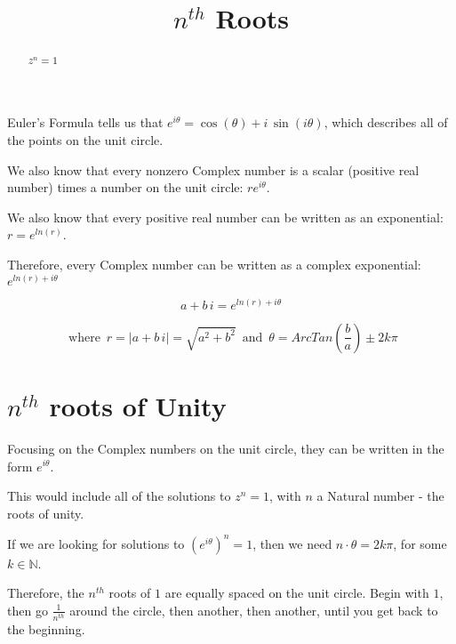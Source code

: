 \documentclass{ximera}
\title{$n^{th}$ Roots}
\begin{document}
\begin{abstract}
$z^n = 1$
\end{abstract}
\maketitle






Euler's Formula tells us that $e^{i \theta} = \cos(\theta) + i \, \sin(i \theta)$, which describes all of the points on the unit circle.

We also know that every nonzero Complex number is a scalar (positive real number) times a number on the unit circle:  $r e^{i \theta}$.

We also know that every positive real number can be written as an exponential: $r = e^{ln(r)}$.

Therefore, every Complex number can be written as a complex exponential: $ e^{ln(r) + i \theta}$


\[   a + b \, i =    e^{ln(r) + i \theta}   \]

\[   \text{ where } \,   r = |a + b \, i| = \sqrt{a^2 + b^2}   \, \text{ and } \,   \theta = ArcTan\left (\frac{b}{a} \right) \pm 2k\pi\]





\section{$n^{th}$ roots of Unity}


Focusing on the Complex numbers on the unit circle, they can be written in the form $e^{i \theta}$.


This would include all of the solutions to $z^n = 1$, with $n$ a Natural number - the roots of unity.




If we are looking for solutions to $(e^{i \theta})^n = 1$, then we need $n \cdot \theta = 2k\pi$, for some $k \in \mathbb{N}$.


Therefore, the $n^{th}$ roots of $1$ are equally spaced on the unit circle.  Begin with $1$, then go $\frac{1}{n^{th}}$ around the circle, then another, then another, until you get back to the beginning.
\end{document}
